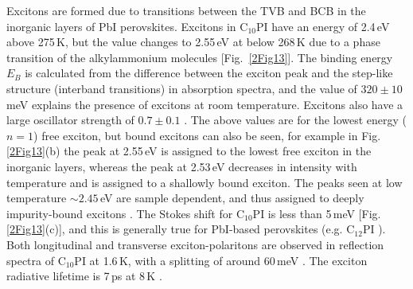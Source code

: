 Excitons are formed due to transitions between the TVB and BCB in the inorganic layers of PbI perovskites. Excitons in $\textrm{C}_{10}$PI have an energy of 2.4\,eV above 275\,K, but the value changes to 2.55\,eV at below 268\,K due to a phase transition of the alkylammonium molecules [Fig.\ \ref{2Fig13}]. The binding energy $E_B$ is calculated from the difference between the exciton peak and the step-like structure (interband transitions) in absorption spectra, and the value of $320\pm10$\,meV explains the presence of excitons at room temperature. Excitons also have a large oscillator strength of $0.7\pm0.1$ \cite{Ishihara1990}. The above values are for the lowest energy ($n=1$) free exciton, but bound excitons can also be seen, for example in Fig.\,\ref{2Fig13}(b) the peak at 2.55\,eV is assigned to the lowest free exciton in the inorganic layers, whereas the peak at 2.53\,eV decreases in intensity with temperature and is assigned to a shallowly bound exciton. The peaks seen at low temperature $\sim2.45$\,eV are sample dependent, and thus assigned to deeply impurity-bound excitons \cite{Ishihara1990}. The Stokes shift for $\textrm{C}_{10}$PI is less than 5\,meV [Fig.\,\ref{2Fig13}(c)], and this is generally true for PbI-based perovskites (e.g. $\textrm{C}_{12}$PI \cite{Pradeesh2009}). Both longitudinal and transverse exciton-polaritons are observed in reflection spectra of $\textrm{C}_{10}$PI at 1.6\,K, with a splitting of around 60\,meV \cite{Ishihara1990, Ishihara1989}. The exciton radiative lifetime is 7\,ps at 8\,K \cite{Kondo1998a}.

